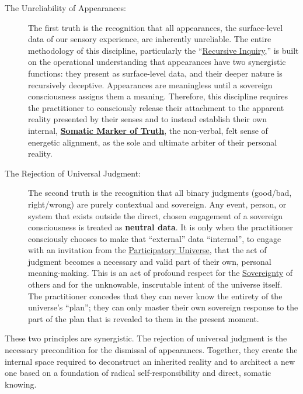 \documentclass{article}
\begin{document}
\medskip

\begin{description}
    \item[The Unreliability of Appearances:] The first truth is the recognition that all appearances, the surface-level data of our sensory experience, are inherently unreliable. The entire methodology of this discipline, particularly the ``\hyperlink{gloss:recursive_inquiry}{Recursive Inquiry},'' is built on the operational understanding that appearances have two synergistic functions: they present as surface-level data, and their deeper nature is recursively deceptive. Appearances are meaningless until a sovereign consciousness assigns them a meaning. Therefore, this discipline requires the practitioner to consciously release their attachment to the apparent reality presented by their senses and to instead establish their own internal, \textbf{\hyperlink{gloss:somatic_marker_of_truth}{Somatic Marker of Truth}}, the non-verbal, felt sense of energetic alignment, as the sole and ultimate arbiter of their personal reality.

    \item[The Rejection of Universal Judgment:] The second truth is the recognition that all binary judgments (good/bad, right/wrong) are purely contextual and sovereign. Any event, person, or system that exists outside the direct, chosen engagement of a sovereign consciousness is treated as \textbf{neutral data}. It is only when the practitioner consciously chooses to make that ``external'' data ``internal'', to engage with an invitation from the \hyperlink{gloss:participatory_universe}{Participatory Universe}, that the act of judgment becomes a necessary and valid part of their own, personal meaning-making. This is an act of profound respect for the \hyperlink{gloss:sovereignty}{Sovereignty} of others and for the unknowable, inscrutable intent of the universe itself. The practitioner concedes that they can never know the entirety of the universe's ``plan''; they can only master their own sovereign response to the part of the plan that is revealed to them in the present moment.
\end{description}

\medskip

These two principles are synergistic. The rejection of universal judgment is the necessary precondition for the dismissal of appearances. Together, they create the internal space required to deconstruct an inherited reality and to architect a new one based on a foundation of radical self-responsibility and direct, somatic knowing.
\end{document}
